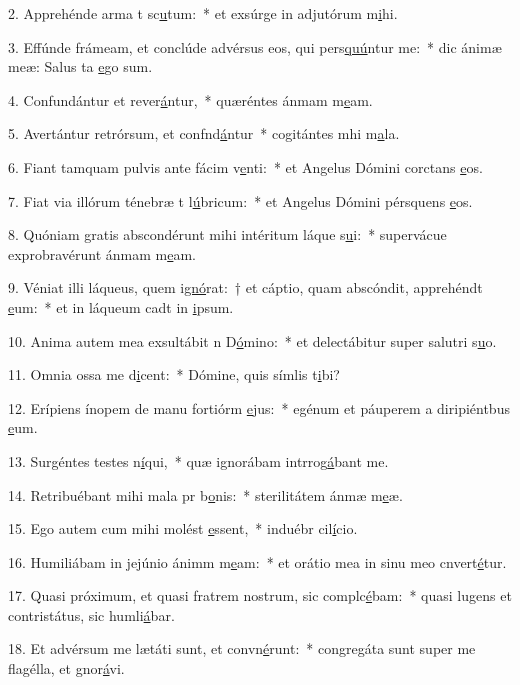 2. Apprehénde arma t sc\uline{u}tum:~* et exsúrge in adjutórum m\uline{i}hi.\par 
3. Effúnde frámeam, et conclúde advérsus eos, qui pers\uline{quú}ntur me:~* dic ánimæ meæ: Salus ta \uline{e}go sum.\par 
4. Confundántur et rever\uline{á}ntur,~* quæréntes ánmam m\uline{e}am.\par 
5. Avertántur retrórsum, et confnd\uline{á}ntur~* cogitántes mhi m\uline{a}la.\par 
6. Fiant tamquam pulvis ante fácim v\uline{e}nti:~* et Angelus Dómini corctans \uline{e}os.\par 
7. Fiat via illórum ténebræ t l\uline{ú}bricum:~* et Angelus Dómini pérsquens \uline{e}os.\par 
8. Quóniam gratis abscondérunt mihi intéritum láque s\uline{u}i:~* supervácue exprobravérunt ánmam m\uline{e}am.\par 
9. Véniat illi láqueus, quem i\uline{gnó}rat:~† et cáptio, quam abscóndit, apprehéndt \uline{e}um:~* et in láqueum cadt in \uline{i}psum.\par 
10. Anima autem mea exsultábit n D\uline{ó}mino:~* et delectábitur super salutri s\uline{u}o.\par 
11. Omnia ossa me d\uline{i}cent:~* Dómine, quis símlis t\uline{i}bi?\par 
12. Erípiens ínopem de manu fortiórm \uline{e}jus:~* egénum et páuperem a diripiéntbus \uline{e}um.\par 
13. Surgéntes testes n\uline{í}qui,~* quæ ignorábam intrrog\uline{á}bant me.\par 
14. Retribuébant mihi mala pr b\uline{o}nis:~* sterilitátem ánmæ m\uline{e}æ.\par 
15. Ego autem cum mihi molést \uline{e}ssent,~* induébr cil\uline{í}cio.\par 
16. Humiliábam in jejúnio ánimm m\uline{e}am:~* et orátio mea in sinu meo cnvert\uline{é}tur.\par 
17. Quasi próximum, et quasi fratrem nostrum, sic complc\uline{é}bam:~* quasi lugens et contristátus, sic humli\uline{á}bar.\par 
18. Et advérsum me lætáti sunt, et convn\uline{é}runt:~* congregáta sunt super me flagélla, et gnor\uline{á}vi.\par 
